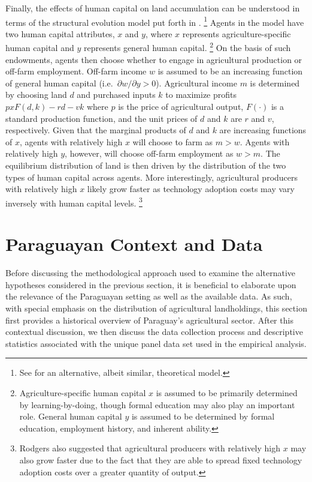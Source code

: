 \documentclass[english]{article}
\begin{document}
Finally, the effects of human capital on land accumulation can be understood
in terms of the structural evolution model put forth in \citet{rodgers1994}.%
\footnote{See \citet{sumner1987} for an alternative, albeit similar, theoretical
model.}
Agents in the model have two human capital attributes, $x$ and $y$, where
$x$ represents agriculture-specific human capital and $y$ represents general 
human capital.%
\footnote{Agriculture-specific human capital $x$ is assumed to be primarily 
determined by learning-by-doing, though formal education may also play an 
important role. 
General human capital $y$ is assumed to be determined by formal education, 
employment history, and inherent ability.}
On the basis of such endowments, agents then choose whether to engage in 
agricultural production or off-farm employment.
Off-farm income $w$ is assumed to be an increasing function of general
human capital (i.e.\ $\partial w/ \partial y > 0$). 
Agricultural income $m$ is determined by choosing land $d$ and purchased 
inputs $k$ to maximize profits $p x F(d,k) - rd - vk$ where $p$ is the price 
of agricultural output, $F(\cdot)$ is a standard production function, 
and the unit prices of $d$ and $k$ are $r$ and $v$, respectively.
Given that the marginal products of $d$ and $k$ are increasing functions of 
$x$, agents with relatively high $x$ will choose to farm as $m > w$.
Agents with relatively high $y$, however, will choose off-farm employment
 as $w > m$.
The equilibrium distribution of land is then driven by the distribution of the 
two types of human capital across agents.
More interestingly, agricultural producers with relatively high $x$ likely 
grow faster as technology adoption costs may vary inversely with human 
capital levels.%
\footnote{Rodgers also suggested that agricultural producers with relatively 
high $x$ may also grow faster due to the fact that they are able to spread fixed 
technology adoption costs over a greater quantity of output.}


\section{Paraguayan Context and Data}
\label{sec: data}

Before discussing the methodological approach used to examine the alternative
hypotheses considered in the previous section, it is beneficial to elaborate upon 
the relevance of the Paraguayan setting as well as the available data.
As such, with special emphasis on the distribution of agricultural landholdings, 
this section first provides a historical overview of Paraguay's agricultural sector. 
After this contextual discussion, we then discuss the data collection process 
and descriptive statistics associated with the unique panel data set used in the 
empirical analysis.
\end{document}
